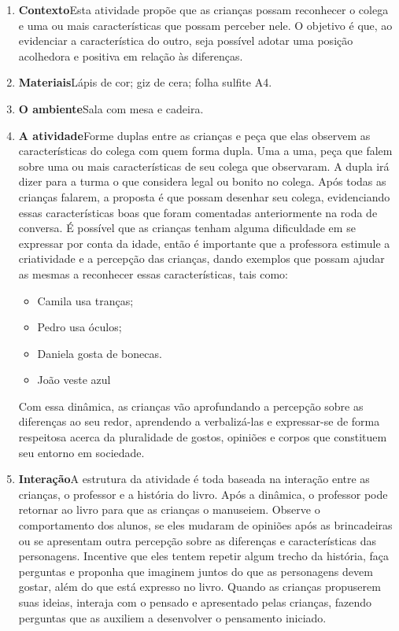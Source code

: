 \documentclass[11pt]{extarticle}
\begin{document}
\begin{enumerate}
\item \textbf{Contexto}\quad Esta atividade propõe que as crianças possam reconhecer o colega e uma ou mais características que possam perceber nele. O objetivo é que, ao evidenciar a característica do outro, seja possível adotar uma posição acolhedora e positiva em relação às diferenças.

\item \textbf{Materiais}\quad Lápis de cor; giz de cera; folha sulfite A4.

\item \textbf{O ambiente}\quad Sala com mesa e cadeira.


\item \textbf{A atividade}\quad Forme duplas entre as crianças e peça que elas observem as características do colega com quem forma dupla. Uma a uma, peça que falem sobre uma ou mais características de seu colega que observaram. A dupla irá dizer para a turma o que considera legal ou bonito no colega. Após todas as crianças falarem, a proposta é que possam desenhar seu colega, evidenciando essas características boas que foram comentadas anteriormente na roda de conversa. É possível que as crianças tenham alguma dificuldade em se expressar por conta da idade, então é importante que a professora estimule a criatividade e a percepção das crianças, dando exemplos que possam ajudar as mesmas a reconhecer essas características, tais como:

\begin{itemize}
\item Camila usa tranças;
\item Pedro usa óculos;
\item Daniela gosta de bonecas.
\item João veste azul
\end{itemize}

Com essa dinâmica, as crianças vão aprofundando a percepção sobre as diferenças ao seu redor, aprendendo a verbalizá-las e expressar-se de forma respeitosa acerca da pluralidade de gostos, opiniões e corpos que constituem seu entorno em sociedade. 

\item \textbf{Interação}\quad A estrutura da atividade é toda baseada na interação entre as crianças, o professor e a história do livro. Após a dinâmica, o professor pode retornar ao livro para que as crianças o manuseiem. Observe o comportamento dos alunos, se eles mudaram de opiniões após as brincadeiras ou se apresentam outra percepção sobre as diferenças e características das personagens. Incentive que eles tentem repetir algum trecho da história,
faça perguntas e proponha que imaginem juntos do que as personagens devem gostar, além do que está expresso no livro. Quando as crianças propuserem suas ideias, interaja com o pensado e apresentado pelas crianças, fazendo perguntas que as auxiliem a desenvolver o pensamento iniciado.


\end{enumerate}
\end{document}
